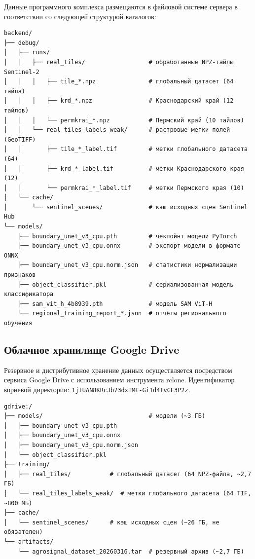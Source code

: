 \documentclass[14pt,a4paper]{extarticle}
\newcommand{\tbl}[1]{\texttt{#1}}  %
\begin{document}
Данные программного комплекса размещаются в файловой системе сервера
в соответствии со следующей структурой каталогов:

\begin{lstlisting}
backend/
├── debug/
│   ├── runs/
│   │   ├── real_tiles/                  # обработанные NPZ-тайлы Sentinel-2
│   │   │   ├── tile_*.npz               # глобальный датасет (64 тайла)
│   │   │   ├── krd_*.npz                # Краснодарский край (12 тайлов)
│   │   │   └── permkrai_*.npz           # Пермский край (10 тайлов)
│   │   └── real_tiles_labels_weak/      # растровые метки полей (GeoTIFF)
│   │       ├── tile_*_label.tif         # метки глобального датасета (64)
│   │       ├── krd_*_label.tif          # метки Краснодарского края (12)
│   │       └── permkrai_*_label.tif     # метки Пермского края (10)
│   └── cache/
│       └── sentinel_scenes/             # кэш исходных сцен Sentinel Hub
└── models/
    ├── boundary_unet_v3_cpu.pth         # чекпойнт модели PyTorch
    ├── boundary_unet_v3_cpu.onnx        # экспорт модели в формате ONNX
    ├── boundary_unet_v3_cpu.norm.json   # статистики нормализации признаков
    ├── object_classifier.pkl            # сериализованная модель классификатора
    ├── sam_vit_h_4b8939.pth             # модель SAM ViT-H
    └── regional_training_report_*.json  # отчёты регионального обучения
\end{lstlisting}

\subsection{Облачное хранилище Google Drive}

Резервное и дистрибутивное хранение данных осуществляется посредством сервиса
Google Drive с использованием инструмента rclone. Идентификатор корневой
директории: \tbl{1jtUAN8KRcJb73dxTME-Gi1d4TvGF3P2z}.

\begin{lstlisting}
gdrive:/
├── models/                              # модели (~3 ГБ)
│   ├── boundary_unet_v3_cpu.pth
│   ├── boundary_unet_v3_cpu.onnx
│   ├── boundary_unet_v3_cpu.norm.json
│   └── object_classifier.pkl
├── training/
│   ├── real_tiles/           # глобальный датасет (64 NPZ-файла, ~2,7 ГБ)
│   └── real_tiles_labels_weak/  # метки глобального датасета (64 TIF, ~800 МБ)
├── cache/
│   └── sentinel_scenes/      # кэш исходных сцен (~26 ГБ, не обязателен)
└── artifacts/
    └── agrosignal_dataset_20260316.tar  # резервный архив (~2,7 ГБ)
\end{lstlisting}
\end{document}
